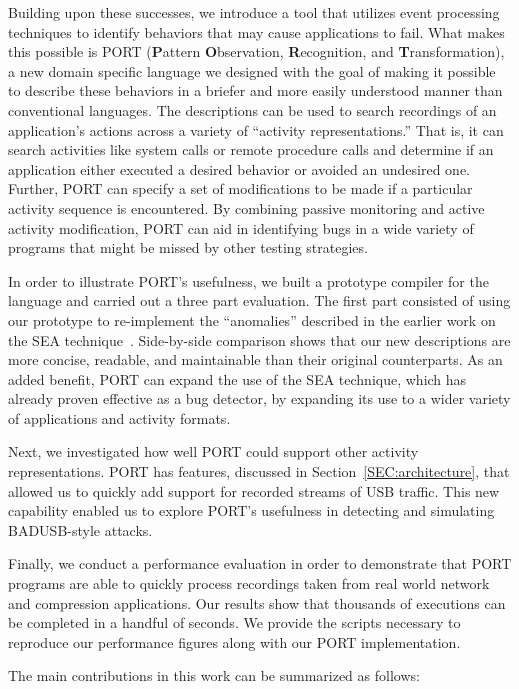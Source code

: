 Building upon these successes,
we introduce a tool
that utilizes event processing techniques
to identify
behaviors 
that may cause applications to fail.
What makes this possible is PORT
(\textbf{P}attern \textbf{O}bservation, \textbf{R}ecognition, and
\textbf{T}ransformation),
a new domain specific language
we designed with the goal of
making it possible
to describe
these behaviors
in a briefer and more easily understood manner than conventional languages.
The descriptions can be used
to search recordings of an application's actions
across a variety of ``activity representations.'' That is, it can search activities like
system calls
or remote procedure calls and determine if  an application either executed a desired behavior
or avoided an undesired one.
Further, PORT can specify
a set of modifications
to be made
if a particular activity sequence is encountered.
By combining passive monitoring and active activity modification,
PORT can aid in identifying bugs
in a wide variety of programs
that might be missed by other testing strategies.

In order to illustrate PORT's usefulness,
we built a prototype compiler
for the language
and carried out a three part evaluation.
The first part consisted of using our prototype
to
re-implement the ``anomalies''
described in the earlier work on the SEA technique~\cite{DBLP:conf/issre/MooreCFW19}.
Side-by-side comparison shows that our new
descriptions are more concise,
readable,
and maintainable
than their original counterparts.
As an added benefit,
PORT can expand the use of the SEA technique,
which has already proven effective as a bug detector,
by expanding its use
to a wider variety of applications and activity formats.

Next,
we investigated how well PORT could support
other activity representations. 
PORT has features, discussed in
Section~\ref{SEC:architecture},
that allowed us to quickly
add support for recorded streams of USB
traffic. This new capability enabled us to explore PORT's usefulness in detecting and simulating BADUSB-style attacks.

Finally,
we conduct a performance evaluation in order
to demonstrate that PORT programs are able to quickly 
process recordings taken from real world network and compression applications.
Our results show that thousands of executions can be completed in a handful of seconds.  We provide the scripts necessary to reproduce our performance figures along with our PORT implementation.


The main contributions in this work can be summarized as follows:

